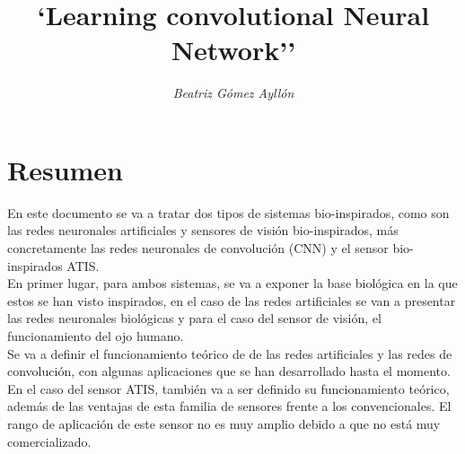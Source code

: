 \documentclass[12pt,a4paper,titlepage,twoside]{book}
\title{\Huge \textbf{`Learning convolutional Neural Network''}}
\author{\Huge \textit{Beatriz G\'omez Ayll\'on}}
\newcommand{\blankpage}{
\newpage \thispagestyle{empty}
\emph{  }
\newpage
}
\begin{document}
\mtcaddchapter %

\frontmatter
\marginsize{3.0cm}{2.0cm}{3.5cm}{2.5cm}


%




%


\maketitle
\blankpage %

%

%	


\chapter*{Resumen}
En este documento se va a tratar dos tipos de sistemas bio-inspirados, como son las redes neuronales artificiales y sensores de visión bio-inspirados, más concretamente las redes neuronales de convolución (CNN) y el sensor bio-inspirados ATIS.\\

En primer lugar, para ambos sistemas, se va a exponer la base biológica en la que estos se han visto inspirados, en el caso de las redes artificiales se van a presentar las redes neuronales biológicas y para el caso del sensor de visión, el funcionamiento del ojo humano.\\

Se va a definir el funcionamiento teórico de de las redes artificiales y las redes de convolución, con algunas aplicaciones que se han desarrollado hasta el momento.\\

En el caso del sensor ATIS, también va a ser definido su funcionamiento teórico, además de las ventajas de esta familia de sensores frente a los convencionales. El rango de aplicación de este sensor no es muy amplio debido a que no está muy comercializado. \\
\end{document}
